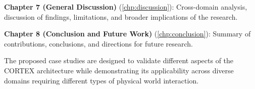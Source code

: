 \textbf{Chapter 7 (General Discussion)} (\autoref{chp:discussion}): Cross-domain analysis, discussion of findings, limitations, and broader implications of the research.

\textbf{Chapter 8 (Conclusion and Future Work)} (\autoref{chp:conclusion}): Summary of contributions, conclusions, and directions for future research.

The proposed case studies are designed to validate different aspects of the CORTEX architecture while demonstrating its applicability across diverse domains requiring different types of physical world interaction.
